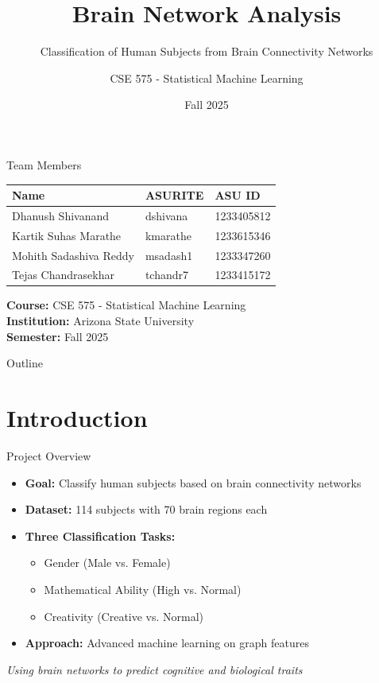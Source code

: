 \documentclass{beamer}
\title[Brain Network Analysis]{Brain Network Analysis}
\subtitle{Classification of Human Subjects from Brain Connectivity Networks}
\author{CSE 575 - Statistical Machine Learning}
\institute{Arizona State University}
\date{Fall 2025}
\begin{document}
\begin{frame}
    \titlepage
\end{frame}

\begin{frame}{Team Members}
\begin{table}
\centering
\small
\begin{tabular}{lll}
\toprule
\textbf{Name} & \textbf{ASURITE} & \textbf{ASU ID} \\
\midrule
Dhanush Shivanand & dshivana & 1233405812 \\
Kartik Suhas Marathe & kmarathe & 1233615346 \\
Mohith Sadashiva Reddy & msadash1 & 1233347260 \\
Tejas Chandrasekhar & tchandr7 & 1233415172 \\
\bottomrule
\end{tabular}
\end{table}

\vskip 1cm
\centering
\textbf{Course:} CSE 575 - Statistical Machine Learning\\
\textbf{Institution:} Arizona State University\\
\textbf{Semester:} Fall 2025
\end{frame}

\begin{frame}{Outline}
    \tableofcontents
\end{frame}

\section{Introduction}

\begin{frame}{Project Overview}
\begin{itemize}
  \item \textbf{Goal:} Classify human subjects based on brain connectivity networks
  \item \textbf{Dataset:} 114 subjects with 70 brain regions each
  \item \textbf{Three Classification Tasks:}
  \begin{itemize}
    \item Gender (Male vs. Female)
    \item Mathematical Ability (High vs. Normal)
    \item Creativity (Creative vs. Normal)
  \end{itemize}
  \item \textbf{Approach:} Advanced machine learning on graph features
\end{itemize}

\vskip 0.5cm
\small{\textit{Using brain networks to predict cognitive and biological traits}}
\end{frame}
\end{document}
